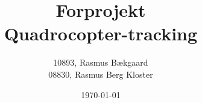 \documentclass[oneside, 12pt]{memoir}
\title{Forprojekt
\\
Quadrocopter-tracking}
\date{\today}
\author{10893, Rasmus Bækgaard\\08830, Rasmus Berg Kloster}
\begin{document}
\begin{titlingpage}
  \maketitle
\end{titlingpage}

\newpage
\tableofcontents*
\listoffixmes 












\end{document}
